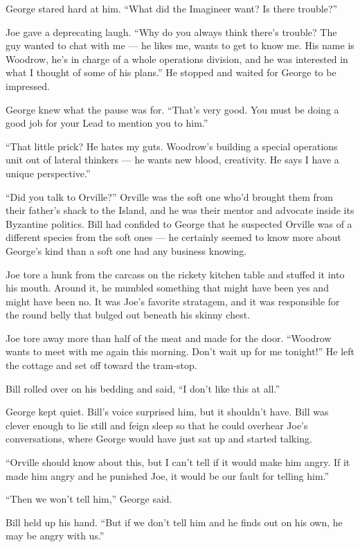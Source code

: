 George stared hard at him.
``What did the Imagineer want? Is there trouble?''

Joe gave a deprecating laugh.
``Why do you always think there's trouble? The guy wanted to chat with me --- 
he likes me, wants to get to know me. His name is Woodrow, he's in charge of a 
whole operations division, and he was interested in what I thought of some of 
his plans.''
He stopped and waited for George to be impressed.

George knew what the pause was for.
``That's very good. You must be doing a good job for your Lead to mention you 
to him.''

``That little prick? He hates my guts. Woodrow's building a special operations 
unit out of lateral thinkers --- he wants new blood, creativity. He says I have 
a unique perspective.''

``Did you talk to Orville?'' Orville was the soft one who'd brought
them from their father's shack to the Island, and he was their
mentor and advocate inside its Byzantine politics. Bill had
confided to George that he suspected Orville was of a different
species from the soft ones --- he certainly seemed to know more
about George's kind than a soft one had any business knowing.

Joe tore a hunk from the carcass on the rickety kitchen table and
stuffed it into his mouth. Around it, he mumbled something that
might have been yes and might have been no. It was Joe's favorite
stratagem, and it was responsible for the round belly that bulged
out beneath his skinny chest.

Joe tore away more than half of the meat and made for the door.
``Woodrow wants to meet with me again this morning. Don't wait up for me 
tonight!''
He left the cottage and set off toward the tram-stop.

Bill rolled over on his bedding and said,
``I don't like this at all.''

George kept quiet. Bill's voice surprised him, but it shouldn't
have. Bill was clever enough to lie still and feign sleep so that
he could overhear Joe's conversations, where George would have just
sat up and started talking.

``Orville should know about this, but I can't tell if it would make him angry. 
If it made him angry and he punished Joe, it would be our fault for telling 
him.''

``Then we won't tell him,'' George said.

Bill held up his hand.
``But if we don't tell him and he finds out on his own, he may be angry with 
us.''


